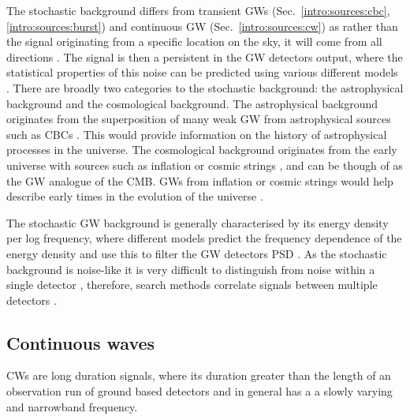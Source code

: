 The stochastic background differs from transient \glspl{GW} (Sec.~\ref{intro:sources:cbc}, \ref{intro:sources:burst}) and continuous \gls{GW} (Sec.~\ref{intro:sources:cw}) as rather than the signal originating from a specific location on the sky, it will come from all directions \citep{christensen2018StochasticGravitational}. 
The signal is then a persistent in the \gls{GW} detectors output, where the statistical properties of this noise can be predicted using various different models \citep{christensen2018StochasticGravitational}.   
There are broadly two categories to the stochastic background: the astrophysical background and the cosmological background. 
The astrophysical background originates from the superposition of many weak \gls{GW} from astrophysical sources such as \glspl{CBC} \citep{regimbau2011AstrophysicalGravitational}. 
This would provide information on the history of astrophysical processes in the universe.
The cosmological background originates from the early universe with sources such as inflation or cosmic strings \citep{maggiore2000GravitationalWave}, and can be though of as the \gls{GW} analogue of the \gls{CMB}.
\glspl{GW} from inflation or cosmic strings would help describe early times in the evolution of the universe \citep{christensen2018StochasticGravitational}.

The stochastic \gls{GW} background is generally characterised by its energy density per log frequency, where different models predict the frequency dependence of the energy density and use this to filter the \gls{GW} detectors \gls{PSD} \citep{allen1999DetectingStochastic}.
As the stochastic background is noise-like it is very difficult to distinguish from noise within a single detector \citep{christensen2018StochasticGravitational}, therefore, search methods correlate signals between multiple detectors
\citep{romano2019SearchesStochastic,christensen2018StochasticGravitational,allen1999DetectingStochastic}.


\subsection{\label{intro:sources:cw}Continuous waves}

\glspl{CW} are long duration signals, where its duration greater than
the length of an observation run of ground based detectors and in general has a
a slowly varying and narrowband frequency. 

